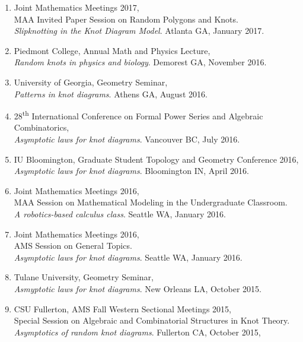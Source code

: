 \documentclass[letterpaper]{article}
\begin{document}
\begin{enumerate}
\item Joint Mathematics Meetings 2017, \\
  MAA Invited Paper Session on Random Polygons and Knots. \\
  \textit{Slipknotting in the Knot Diagram Model}. Atlanta GA, January 2017.

\item Piedmont College, Annual Math and Physics Lecture, \\
  \textit{Random knots in physics and biology}. Demorest GA, November 2016.

\item University of Georgia, Geometry Seminar, \\
  \textit{Patterns in knot diagrams}. Athens GA, August 2016. 

\item 28\textsuperscript{th} International Conference on Formal Power Series and
  Algebraic Combinatorics, \\
  \textit{Asymptotic laws for knot diagrams}. Vancouver BC, July 2016.

\item IU Bloomington, Graduate Student Topology and Geometry Conference 2016, \\
  \textit{Asymptotic laws for knot diagrams}. Bloomington IN, April 2016.
  
\item Joint Mathematics Meetings 2016, \\
  MAA Session on Mathematical Modeling in the Undergraduate Classroom. \\
  \textit{A robotics-based calculus class}. Seattle WA, January 2016.

\item Joint Mathematics Meetings 2016, \\
  AMS Session on General Topics. \\
  \textit{Asymptotic laws for knot diagrams}. Seattle WA, January 2016.

\item Tulane University, Geometry Seminar, \\
  \textit{Asmyptotic laws for knot diagrams}. New Orleans LA, October 2015.

\item CSU Fullerton, AMS Fall Western Sectional Meetings 2015,\\
  Special Session on Algebraic and Combinatorial Structures in Knot Theory. \\
  \textit{Asymptotics of random knot diagrams}. Fullerton CA, October 2015,


\end{enumerate}
\end{document}
